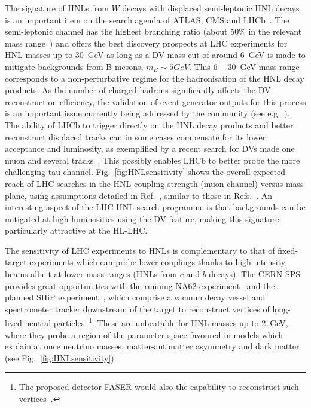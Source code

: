 The signature of HNLs from $W$ decays with displaced semi-leptonic HNL decays is an important item on the search agenda of ATLAS, CMS and LHCb~\cite{Helo2014,Izaguirre2015,Mermod2017,Antusch2017,Nemevsek:2018bbt,Cottin:2018kmq}. The semi-leptonic channel has the highest branching ratio (about 50\% in the relevant mass range~\cite{Gronau1984}) and offers the best discovery prospects at LHC experiments for HNL masses up to 30~GeV as long as a DV mass cut of around 6~GeV is made to mitigate backgrounds from B-mesons, $m_B \sim 5 GeV$. This $6-30$~GeV mass range corresponds to a non-perturbative regime for the hadronisation of the HNL decay products. As the number of charged hadrons significantly affects the DV reconstruction efficiency, the validation of event generator outputs for this process is an important issue currently being addressed by the community (see e.g.~\cite{Cottin:2018kmq}). The ability of LHCb to trigger directly on the HNL decay products and better reconstruct displaced tracks can in some cases compensate for its lower acceptance and luminosity, as exemplified by a recent search for DVs made one muon and several tracks~\cite{LHCb2017,Antusch2017}. This possibly enables LHCb to better probe the more challenging tau channel. Fig.~\ref{fig:HNLsensitivity} shows the overall expected reach of LHC searches in the HNL coupling strength (muon channel) versus mass plane, using assumptions detailed in Ref.~\cite{Mermod2017}, similar to those in Refs.~\cite{Helo2014,Izaguirre2015}. An interesting aspect of the LHC HNL search programme is that backgrounds can be mitigated at high luminosities using the DV feature, making this signature particularly attractive at the HL-LHC. 

The sensitivity of LHC experiments to HNLs is complementary to that of fixed-target experiments which can probe lower couplings thanks to high-intensity beams albeit at lower mass ranges (HNLs from $c$ and $b$ decays). The CERN SPS provides great opportunities with the running NA62 experiment~\cite{NA622017a} and the planned SHiP experiment~\cite{SHiP2015}, which comprise a vacuum decay vessel and spectrometer tracker downstream of the target to reconstruct vertices of long-lived neutral particles~\footnote{The proposed detector FASER would also the capability to reconstruct such vertices~\cite{Kling:2018wct}.}. These are unbeatable for HNL masses up to 2~GeV, where they probe a region of the parameter space favoured in models which explain at once neutrino masses, matter-antimatter asymmetry and dark matter~\cite{Asaka2005b,Canetti2013b,Mermod2017b} (see Fig.~\ref{fig:HNLsensitivity}).

